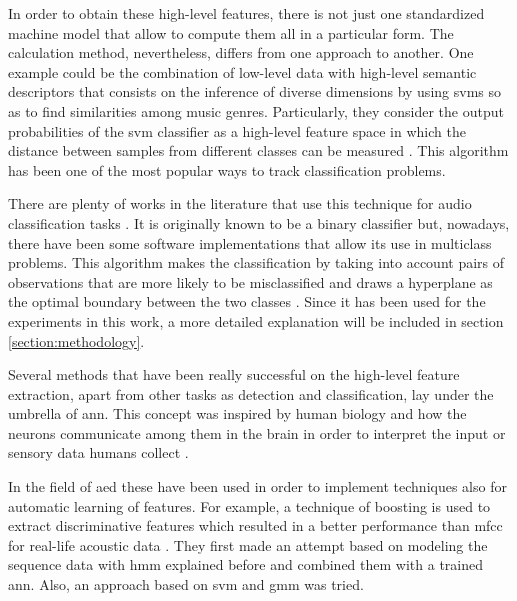 	In order to obtain these high-level features, there is not just one standardized machine model that allow to compute them all in a particular form. The calculation method, nevertheless, differs from one approach to another. One example could be the combination of low-level data with high-level semantic descriptors that consists on the inference of diverse dimensions by using \acrlong{svm}s so as to find similarities among music genres. Particularly, they consider the output probabilities of the \acrshort{svm} classifier as a high-level feature space in which the distance between samples from different classes can be measured \cite{Bogdanov2011}. This algorithm has been one of the most popular ways to track classification problems.
	 
	There are plenty of works in the literature that use this technique for audio classification tasks \cite{Jiang2005} \cite{Geiger2013} \cite{Barchiesi2015}. It is originally known to be a binary classifier but, nowadays, there have been some software implementations that allow its use in multiclass problems. This algorithm makes the classification by taking into account pairs of observations that are more likely to be misclassified and draws a hyperplane as the optimal boundary between the two classes \cite{Fu2011}. Since it has been used for the experiments in this work, a more detailed explanation will be included in section \ref{section:methodology}.
	
	Several methods that have been really successful on the high-level feature extraction, apart from other tasks as detection and classification, lay under the umbrella of \acrfull{ann}. This concept was inspired by human biology and how the neurons communicate among them in the brain in order to interpret the input or sensory data humans collect \cite{Kwon2011}. 
	
	In the field of \acrshort{aed} these have been used in order to implement techniques also for automatic learning of features. For example, a technique of boosting is used to extract discriminative features which resulted in a better performance than \acrshort{mfcc} for real-life acoustic data \cite{Zhuang2010}. They first made an attempt based on modeling the sequence data with \acrshort{hmm} explained before and combined them with a trained \acrshort{ann}. Also, an approach based on \acrshort{svm} and \acrshort{gmm} was tried. 
	
